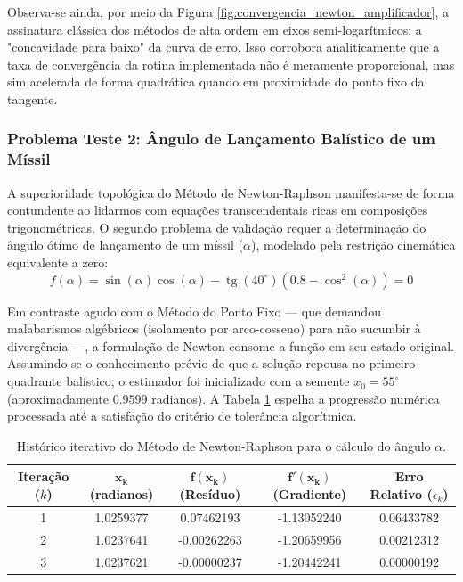 Observa-se ainda, por meio da Figura \ref{fig:convergencia_newton_amplificador}, a assinatura clássica dos métodos de alta ordem em eixos semi-logarítmicos: a "concavidade para baixo" da curva de erro. Isso corrobora analiticamente que a taxa de convergência da rotina implementada não é meramente proporcional, mas sim acelerada de forma quadrática quando em proximidade do ponto fixo da tangente.

\subsubsection{Problema Teste 2: Ângulo de Lançamento Balístico de um Míssil}
\label{subsubsec:problema_teste_2_newton_raphson}

A superioridade topológica do Método de Newton-Raphson manifesta-se de forma contundente ao lidarmos com equações transcendentais ricas em composições trigonométricas. O segundo problema de validação requer a determinação do ângulo ótimo de lançamento de um míssil ($\alpha$), modelado pela restrição cinemática equivalente a zero:
\begin{equation}
    f(\alpha) = \sin(\alpha)\cos(\alpha) - \operatorname{tg}(40^\circ)\left(0.8 - \cos^2(\alpha)\right) = 0
\end{equation}

Em contraste agudo com o Método do Ponto Fixo — que demandou malabarismos algébricos (isolamento por arco-cosseno) para não sucumbir à divergência —, a formulação de Newton consome a função em seu estado original. Assumindo-se o conhecimento prévio de que a solução repousa no primeiro quadrante balístico, o estimador foi inicializado com a semente $x_0 = 55^\circ$ (aproximadamente $0.9599$ radianos). A Tabela \ref{tab:newton_raphson_missil} espelha a progressão numérica processada até a satisfação do critério de tolerância algorítmica.

\begin{table}[htpb]
\centering
\caption{Histórico iterativo do Método de Newton-Raphson para o cálculo do ângulo $\alpha$.}
\label{tab:newton_raphson_missil}
\small
\begin{tabular}{@{}ccccc@{}}
\toprule
\textbf{Iteração ($k$)} & $\mathbf{x_k}$ (radianos) & $\mathbf{f(x_k)}$ (Resíduo) & $\mathbf{f'(x_k)}$ (Gradiente) & \textbf{Erro Relativo} ($\epsilon_k$) \\ \midrule
1 & 1.0259377 & \phantom{-}0.07462193 & -1.13052240 & 0.06433782 \\
2 & 1.0237641 & -0.00262263           & -1.20659956 & 0.00212312 \\
3 & 1.0237621 & -0.00000237           & -1.20442241 & 0.00000192 \\ \bottomrule
\end{tabular}
\end{table}

